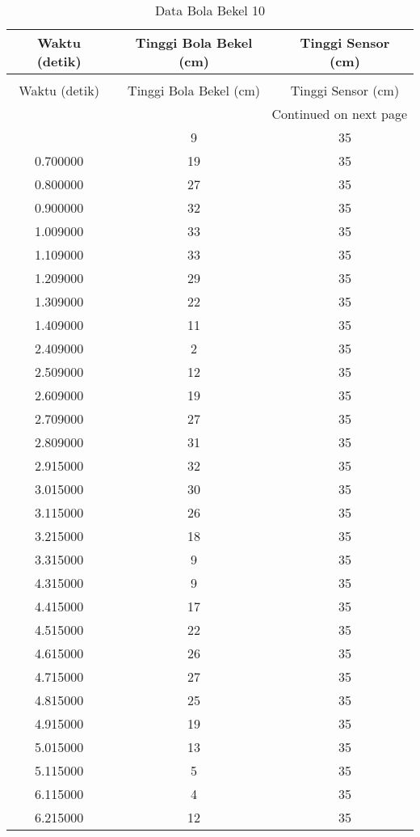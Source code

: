 \begin{longtable}[htbp]{|c|c|c|}
\caption{Data Bola Bekel 10} \\
\hline
Waktu (detik) & Tinggi Bola Bekel (cm) & Tinggi Sensor (cm) \\ \hline
\endfirsthead
\caption[]{Data Bola Bekel 10} \\
\hline
Waktu (detik) & Tinggi Bola Bekel (cm) & Tinggi Sensor (cm) \\ \hline
\endhead
\multicolumn{3}{r}{Continued on next page} \\
\endfoot
\endlastfoot
0.600000 & 9 & 35 \\ \hline
0.700000 & 19 & 35 \\ \hline
0.800000 & 27 & 35 \\ \hline
0.900000 & 32 & 35 \\ \hline
1.009000 & 33 & 35 \\ \hline
1.109000 & 33 & 35 \\ \hline
1.209000 & 29 & 35 \\ \hline
1.309000 & 22 & 35 \\ \hline
1.409000 & 11 & 35 \\ \hline
2.409000 & 2 & 35 \\ \hline
2.509000 & 12 & 35 \\ \hline
2.609000 & 19 & 35 \\ \hline
2.709000 & 27 & 35 \\ \hline
2.809000 & 31 & 35 \\ \hline
2.915000 & 32 & 35 \\ \hline
3.015000 & 30 & 35 \\ \hline
3.115000 & 26 & 35 \\ \hline
3.215000 & 18 & 35 \\ \hline
3.315000 & 9 & 35 \\ \hline
4.315000 & 9 & 35 \\ \hline
4.415000 & 17 & 35 \\ \hline
4.515000 & 22 & 35 \\ \hline
4.615000 & 26 & 35 \\ \hline
4.715000 & 27 & 35 \\ \hline
4.815000 & 25 & 35 \\ \hline
4.915000 & 19 & 35 \\ \hline
5.015000 & 13 & 35 \\ \hline
5.115000 & 5 & 35 \\ \hline
6.115000 & 4 & 35 \\ \hline
6.215000 & 12 & 35 \\ \hline

\end{longtable}
